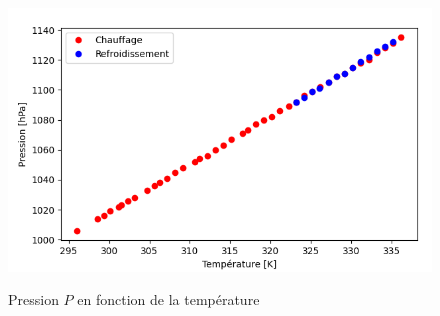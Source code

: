\documentclass[12pt]{article}
\begin{document}
\begin{figure}[!h]
	\begin{center}
		\includegraphics[scale=0.7]{img/exp2_graph1.png}
		\label{Exp2_graph1}
		\caption{Pression $P$ en fonction de la température}
	\end{center}
\end{figure}
\end{document}
